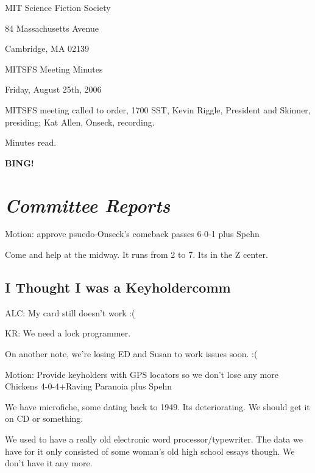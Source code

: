 \documentclass[10pt]{article}
\newcommand{\bing}{{\bf BING!} }
\newcommand{\goto}[1]{\bing \vskip 12pt \section*{{\em{#1}}}}
\newcommand{\ps}{ plus Spehn\xspace}
\begin{document}
\begin{center}

MIT Science Fiction Society

84 Massachusetts Avenue

Cambridge, MA 02139

\vspace{12pt}

MITSFS Meeting Minutes

Friday, August 25th, 2006

\end{center}

\vspace{18pt}

\setlength{\parskip}{6pt}

\noindent
MITSFS meeting called to order, 1700 SST,
Kevin Riggle, President and Skinner, presiding; Kat Allen, Onseck, recording.

Minutes read.

\goto{Committee Reports}

Motion:  approve psuedo-Onseck's comeback passes 6-0-1\ps

Come and help at the midway.  It runs from 2 to 7.  Its in the Z center.

\subsection*{I Thought I was a Keyholdercomm}
ALC:  My card still doesn't work :(

KR:  We need a lock programmer.


On another note, we're losing ED and Susan to work issues soon.  :(

Motion:  Provide keyholders with GPS locators so we don't lose any more  Chickens 4-0-4+Raving Paranoia\ps

We have microfiche, some dating back to 1949.  Its deteriorating.  We should get it on CD or something.

We used to have a really old electronic word processor/typewriter.  The data we have for it only consisted of some woman's old high school essays though.  We don't have it any more.



\end{document}
